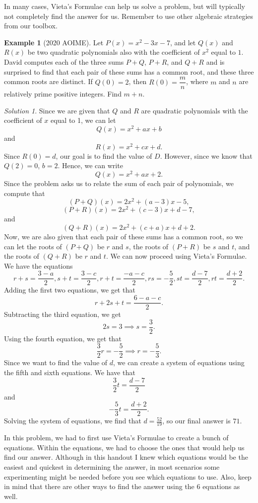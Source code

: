 \documentclass[l1pt]{article}
\theoremstyle{plain}
\theoremstyle{definition}
\newtheorem{example}[thm]{Example}
\theoremstyle{remark}
\newtheorem*{solution}{Solution}
\begin{document}
In many cases, Vieta's Formulae can help us solve a problem, but will typically not completely find the answer for us. Remember to use other algebraic strategies from our toolbox.

\begin{example}[2020 AOIME]
Let $P(x) = x^2 - 3x - 7$, and let $Q(x)$ and $R(x)$ be two quadratic polynomials also with the coefficient of $x^2$ equal to $1$. David computes each of the three sums $P + Q$, $P + R$, and $Q + R$ and is surprised to find that each pair of these sums has a common root, and these three common roots are distinct. If $Q(0) = 2$, then $R(0) = \dfrac mn$, where $m$ and $n$ are relatively prime positive integers. Find $m+n$.
\end{example}

\begin{solution}
Since we are given that $Q$ and $R$ are quadratic polynomials with the coefficient of $x$ equal to 1, we can let \[Q(x)=x^2+ax+b\] and \[R(x)=x^2+cx+d.\] Since $R(0)=d$, our goal is to find the value of $D$. However, since we know that $Q(2)=0$, $b=2$. Hence, we can write \[Q(x)=x^2+ax+2.\] Since the problem asks us to relate the sum of each pair of polynomials, we compute that  \[(P+Q)(x)=2x^2+(a-3)x-5,\] \[(P+R)(x)=2x^2+(c-3)x+d-7,\] and \[(Q+R)(x)=2x^2+(c+a)x+d+2.\] Now, we are also given that each pair of these sums has a common root, so we can let the roots of $(P+Q)$ be $r$ and $s$, the roots of $(P+R)$ be $s$ and $t$, and the roots of $(Q+R)$ be $r$ and $t$. We can now proceed using Vieta's Formulae. We have the equations \[r+s=\frac{3-a}{2}, s+t=\frac{3-c}{2}, r+t=\frac{-a-c}{2}, rs=-\frac{5}{2}, st=\frac{d-7}{2}, rt=\frac{d+2}{2}.\] Adding the first two equations, we get that \[r+2s+t=\frac{6-a-c}{2}.\]Subtracting the third equation, we get \[2s=3 \implies s=\frac{3}{2}.\] Using the fourth equation, we get that \[\frac{3}{2}r=-\frac{5}{2} \implies r=-\frac{5}{3}.\] Since we want to find the value of $d$, we can create a system of equations using the fifth and sixth equations. We have that \[\frac{3}{2}t=\frac{d-7}{2}\] and \[-\frac{5}{3}t=\frac{d+2}{2}.\]Solving the system of equations, we find that  $d=\frac{52}{19}$, so our final answer is $71.$


\end{solution}

\bigskip

In this problem, we had to first use Vieta's Formulae to create a bunch of equations. Within the equations, we had to choose the ones that would help us find our answer. Although in this handout I knew which equations would be the easiest and quickest in determining the answer, in most scenarios some experimenting might be needed before you see which equations to use. Also, keep in mind that there are other ways to find the answer using the 6 equations as well.
\end{document}

